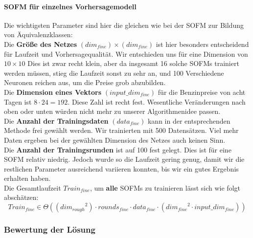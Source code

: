 \documentclass[11pt]{article}
\begin{document}
	\paragraph{SOFM für einzelnes Vorhersagemodell\\}
	Die wichtigsten Parameter sind hier die gleichen wie bei der SOFM zur Bildung von Äquivalenzklassen:\\
	Die \textbf{Größe des Netzes} $(dim_{fine}) \times (dim_{fine})$ ist hier besonders entscheidend für Laufzeit und Vorhersagequalität. Wir entschieden uns für eine Dimension von $10 \times 10$ Dies ist zwar recht klein, aber da insgesamt 16 solche SOFMs trainiert werden müssen, stieg die Laufzeit sonst zu sehr an, und 100 Verschiedene Neuronen reichen aus, um die Preise grob abzubilden.\\
	Die \textbf{Dimension eines Vektors} $(input\_dim_{fine})$ für die Benzinpreise von acht Tagen  ist  $8 \cdot 24 = 192$. Diese Zahl ist recht fest. Wesentliche Veränderungen nach oben oder unten würden nicht mehr zu unserer Algorithmenidee passen.\\
	Die \textbf{Anzahl der Trainingsdaten} $(data_{fine})$ kann in der entsprechenden Methode frei gewählt werden. Wir trainierten mit 500 Datensätzen. Viel mehr Daten ergeben bei der gewählten Dimension des Netzes auch keinen Sinn.\\
	Die \textbf{Anzahl der Trainingsrunden} ist auf 100 fest gelegt. Dies ist für eine SOFM relativ niedrig. Jedoch wurde so die Laufzeit gering genug, damit wir die restlichen Parameter ausreichend variieren konnten, bis wir ein gutes Ergebnis erhalten haben.\\
	Die Gesamtlaufzeit $Train_{fine}$, um \textbf{alle} SOFMs zu trainieren lässt sich wie folgt abschätzen:
		\[ Train_{fine} \in \Theta \left(\left({dim_{rough}}^2\right)\cdot rounds_{fine} \cdot data_{fine} \cdot \left( {dim_{fine}}^2 \cdot input\_dim_{fine} \right) \right) \]
	
	
\subsubsection{Bewertung der Lösung}
\end{document}
